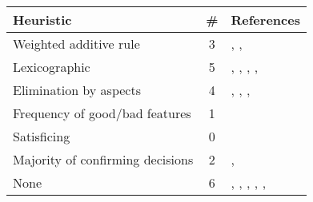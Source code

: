 
\begin{supertabular}[c]{lcp{8em}}
\toprule
Heuristic & \# & References\tabularnewline
\midrule
Weighted additive rule & 3 & \citep{Amirkhanov:2010},
                             \citep{Brecheisen:2009},
                             \citep{Bergner:2013}\tabularnewline
Lexicographic & 5 & \citep{Marks:1997},
                    \citep{Berger:2011},
                    \citep{Torsney-Weir:2011},
                    \citep{Afzal:2011},
                    \citep{Luboschik:2014}\tabularnewline
Elimination by aspects & 4 & \citep{Matkovic:2009},
                             \citep{Spence:1995},
                             \citep{Waser:2010},
                             \citep{Booshehrian:2012}\tabularnewline
Frequency of good/bad features & 1 & \citep{Coffey:2013}\tabularnewline
Satisficing & 0 & \tabularnewline
Majority of confirming decisions & 2 & \citep{Bruckner:2010},
                                       \citep{Pretorius:2011}\tabularnewline
None & 6 & \citep{Matkovic:2008},
           \citep{Konyha:2006},
           \citep{Guo:2009},
           \citep{Potter:2009},
           \citep{Piringer:2010},
           \citep{Unger:2012}\tabularnewline
\bottomrule
\end{supertabular}

